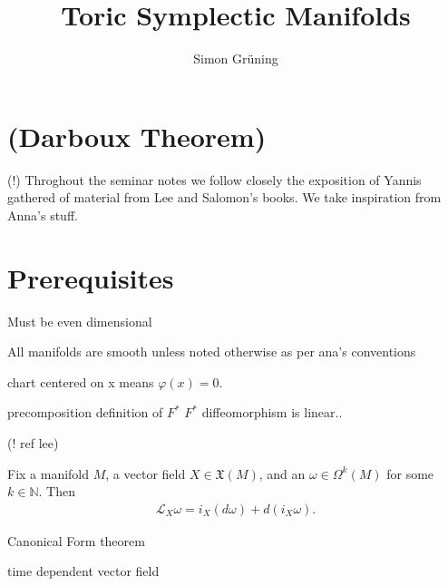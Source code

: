 


\title{Toric Symplectic Manifolds}
\author{Simon Gr\"uning}
\address[Simon Gr\"uning]{University of Zurich, R\"{a}mistrasse 71, 8006 Zurich}


\maketitle

\section*{(Darboux Theorem)}


\clearpage

(!) Throghout the seminar notes we follow closely the exposition of Yannis gathered of material from Lee and Salomon's books. We take inspiration from Anna's stuff.



\section{Prerequisites}

\begin{remark}
Must be even dimensional

All manifolds are smooth unless noted otherwise as per ana's conventions

chart centered on x means $\varphi(x) = 0$.


precomposition definition of $F^*$
$F^*$ diffeomorphism is linear..


\end{remark}

\begin{proposition}
(! ref lee)

Fix a manifold $M$, a vector field $X \in \mathfrak{X}(M)$, and an $\omega \in \Omega^k(M)$ for some $k \in \mathbb{N}$. Then
\begin{align*}
\mathcal{L}_X \omega = i_X(d \omega) + d(i_X \omega).
\end{align*}
\end{proposition}

\begin{theorem}\label{canform}
Canonical Form theorem
\end{theorem}

\begin{definition}
time dependent vector field
\end{definition}

